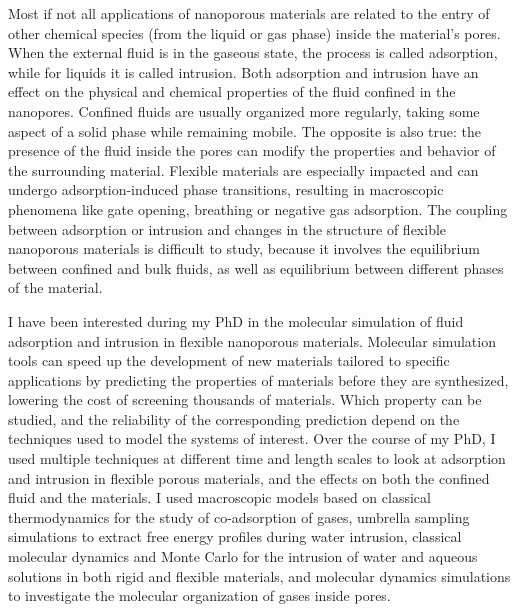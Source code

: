 Most if not all applications of nanoporous materials are related to the entry of
other chemical species (from the liquid or gas phase) inside the material's
pores. When the external fluid is in the gaseous state, the process is called
adsorption, while for liquids it is called intrusion. Both adsorption and
intrusion have an effect on the physical and chemical properties of the fluid
confined in the nanopores. Confined fluids are usually organized more regularly,
taking some aspect of a solid phase while remaining mobile. The opposite is also
true: the presence of the fluid inside the pores can modify the properties and
behavior of the surrounding material. Flexible materials are especially impacted
and can undergo adsorption-induced phase transitions, resulting in macroscopic
phenomena like gate opening, breathing or negative gas adsorption. The coupling
between adsorption or intrusion and changes in the structure of flexible
nanoporous materials is difficult to study, because it involves the equilibrium
between confined and bulk fluids, as well as equilibrium between different
phases of the material.

\newpage
I have been interested during my PhD in the molecular simulation of fluid
adsorption and intrusion in flexible nanoporous materials. Molecular simulation
tools can speed up the development of new materials tailored to specific
applications by predicting the properties of materials before they are
synthesized, lowering the cost of screening thousands of materials. Which
property can be studied, and the reliability of the corresponding prediction
depend on the techniques used to model the systems of interest. Over the course
of my PhD, I used multiple techniques at different time and length scales to
look at adsorption and intrusion in flexible porous materials, and the effects
on both the confined fluid and the materials. I used macroscopic models based on
classical thermodynamics for the study of co-adsorption of gases, umbrella
sampling simulations to extract free energy profiles during water intrusion,
classical molecular dynamics and Monte Carlo for the intrusion of water and
aqueous solutions in both rigid and flexible materials, and \abinitio molecular
dynamics simulations to investigate the molecular organization of gases inside
pores.


